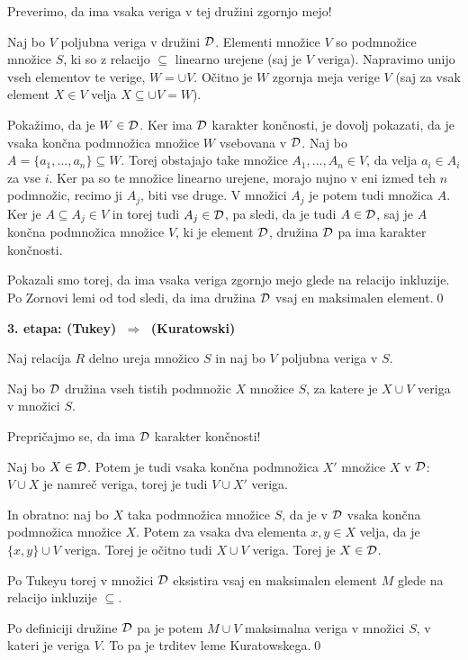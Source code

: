 \documentclass[11pt,paper=b5,DIV=13,headinclude,footinclude]{scrbook}
\def\sledi {{~\Rightarrow~}}
\begin{document}
Preverimo, da ima vsaka veriga v tej družini zgornjo mejo!

Naj bo $V$ poljubna veriga v družini ${\cal D}$. Elementi množice $V$ so podmnožice množice $S$, ki so z relacijo $\subseteq$ linearno urejene (saj je $V$ veriga).
Napravimo unijo vseh elementov te verige, $W = \cup V$. Očitno je $W$ zgornja meja verige $V$ (saj za vsak element $X\in V$ velja $X\subseteq \cup V = W$).

Pokažimo, da je $W\in{\cal D}$. Ker ima ${\cal D}$ karakter končnosti, je dovolj pokazati, da je vsaka končna podmnožica množice $W$ vsebovana v ${\cal D}$.
Naj bo $A=\{a_1,\ldots, a_n\}\subseteq W$. Torej obstajajo take množice $A_1,\ldots, A_n\in V$, da velja $a_i\in A_i$ za vse $i$. Ker pa so te množice linearno urejene, morajo nujno v eni izmed teh $n$ podmnožic, recimo ji $A_j$, biti vse druge. V množici $A_j$ je potem tudi množica $A$. Ker je $A\subseteq A_j\in V$ in torej tudi $A_j\in {\cal D}$, pa sledi, da je tudi $A\in {\cal D}$, saj je $A$ končna podmnožica množice $V$,
ki je element ${\cal D}$, družina ${\cal D}$ pa ima karakter končnosti.

Pokazali smo torej, da ima vsaka veriga zgornjo mejo glede na relacijo inkluzije.
Po Zornovi lemi od tod sledi, da ima družina ${\cal D}$ vsaj en maksimalen element.\qed

\bigskip
\textbf{3. etapa: (Tukey) $\sledi$ (Kuratowski)}

Naj relacija $R$ delno ureja množico $S$ in naj bo $V$ poljubna veriga v $S$.

Naj bo ${\cal D}$ družina vseh tistih podmnožic $X$ množice $S$, za katere je
$X\cup V$ veriga v množici $S$.

Prepričajmo se, da ima ${\cal D}$ karakter končnosti!

Naj bo $X\in {\cal D}$. Potem je tudi vsaka končna podmnožica $X'$ množice $X$ v ${\cal D}$: $V\cup X$ je namreč veriga, torej je tudi $V\cup X'$ veriga.

In obratno: naj bo $X$ taka podmnožica množice $S$, da je v ${\cal D}$ vsaka končna podmnožica množice $X$. Potem za vsaka dva elementa $x,y\in X$ velja, da je
$\{x,y\}\cup V$ veriga. Torej je očitno tudi $X\cup V$ veriga. Torej je $X\in {\cal D}$.

Po Tukeyu torej v množici ${\cal D}$ eksistira vsaj en maksimalen element $M$ glede na relacijo inkluzije $\subseteq$.

Po definiciji družine ${\cal D}$ pa je potem $M\cup V$ maksimalna veriga v množici $S$, v kateri je veriga $V$. To pa je trditev leme Kuratowskega.\qed
\end{document}
